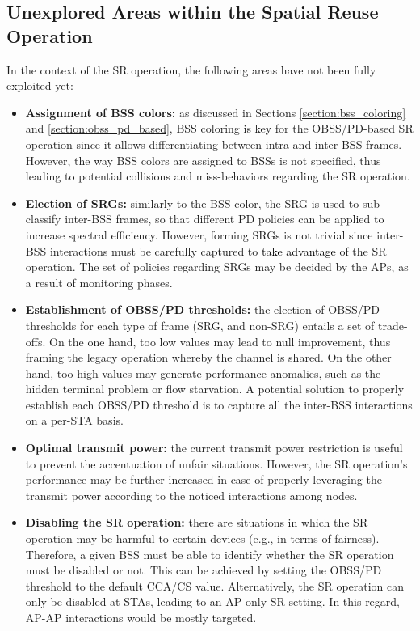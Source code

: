 \documentclass[preprint,12pt]{elsarticle}
\theoremstyle{plain}
\begin{document}
\subsection{Unexplored Areas within the Spatial Reuse Operation}
In the context of the SR operation, the following areas have not been fully exploited yet:
\begin{itemize}
	\item \textbf{Assignment of BSS colors:} as discussed in Sections \ref{section:bss_coloring} and \ref{section:obss_pd_based}, BSS coloring is key for the OBSS/PD-based SR operation since it allows differentiating between intra and inter-BSS frames. However, the way BSS colors are assigned to BSSs is not specified, thus leading to potential collisions and miss-behaviors regarding the SR operation.
	\item \textbf{Election of SRGs:} similarly to the BSS color, the SRG is used to sub-classify inter-BSS frames, so that different PD policies can be applied to increase spectral efficiency. However, forming SRGs is not trivial since inter-BSS interactions must be carefully captured to \textcolor{black}{take advantage} of the SR operation. The set of policies regarding SRGs may be decided by the APs, as a result of monitoring phases.%
	\item \textbf{Establishment of OBSS/PD thresholds:} the election of OBSS/PD thresholds for each type of frame (SRG, and non-SRG) entails a set of trade-offs. On the one hand, too low values may lead to null improvement, thus framing the legacy operation whereby the channel is shared. On the other hand, too high values may generate performance anomalies, such as the hidden terminal problem or flow starvation. A potential solution to properly establish each OBSS/PD threshold is to capture all the inter-BSS interactions on a per-STA basis.
	\item \textbf{Optimal transmit power:} the current transmit power restriction is useful to prevent the accentuation of unfair situations. However, the SR operation's performance may be further increased in case of properly leveraging the transmit power according to the noticed interactions among nodes.
	\item \textbf{Disabling the SR operation:} there are situations in which the SR operation may be harmful to certain devices (e.g., in terms of fairness). Therefore, a given BSS must be able to identify whether the SR operation must be disabled or not. This can be achieved by setting the OBSS/PD threshold to the default CCA/CS value. Alternatively, the SR operation can only be disabled at STAs, leading to an AP-only SR setting. In this regard, AP-AP interactions would be mostly targeted.
\end{itemize}
\end{document}
